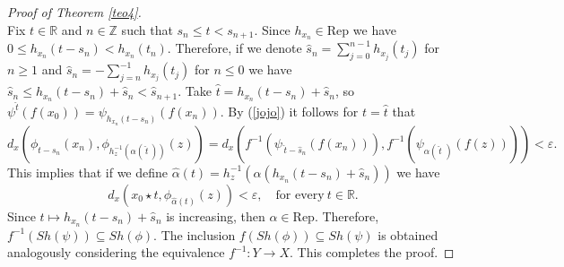 \documentclass{amsart}
\theoremstyle{definition}
\newcommand{\ep}{\varepsilon}
\begin{document}
\begin{proof}[Proof of Theorem \ref{teo4}]
\begin{equation}
\end{equation}
Fix $t\in\mathbb{R}$ and $n\in \mathbb{Z}$ such that $s_n \leq t<s_{n+1}$. Since $h_{x_n}\in\mathrm{Rep}$ we have $0\leq h_{x_n}(t-s_n)<h_{x_n}(t_n)$. Therefore, if we denote $\widehat{s}_n=\sum^{n-1}_{j=0} h_{x_{j}}(t_{j})$ for $n\geq 1$ and $\widehat{s}_n=-\sum^{-1}_{j=n} h_{x_{j}}(t_{j})$ for $n\leq 0$ we have $\widehat{s}_n\leq h_{x_n}(t-s_n)+\widehat{s}_n<\widehat{s}_{n+1}$. Take $\widehat{t}=h_{x_n}(t-s_n)+\widehat{s}_n$, so $\psi^{\widehat{t}}(f(x_0))=\psi_{h_{x_n}(t-s_n)}(f(x_n))$. By (\ref{jojo}) it follows for $t=\widehat{t}$ that
$$d_x(\phi_{t-s_n}(x_n),\phi_{h_{z}^{-1}(\alpha(\,\widehat{t}\ ))}(z))=d_x(f^{-1}(\psi_{\,\widehat{t}-\widehat{s}_n}(f(x_n))), f^{-1}(\psi_{\alpha(\,\widehat{t}\,\,)}(f(z))))<\ep.$$
This implies that if we define $\widehat{\alpha}(t)=h_{z}^{-1}(\alpha(h_{x_n}(t-s_n)+\widehat{s}_n))$ we have
$$d_x(x_0\star t,\phi_{\widehat{\alpha}(t)}(z))<\ep, \quad \mbox{for every}\  t\in\mathbb{R}.$$
Since $t\mapsto h_{x_n}(t-s_n)+\widehat{s}_n$ is increasing, then $\widehat{\alpha}\in \mathrm{Rep}$. Therefore, $f^{-1}(Sh(\psi))\subseteq Sh(\phi)$. The inclusion $f(Sh(\phi))\subseteq Sh(\psi)$ is obtained analogously considering the equivalence $f^{-1}\colon Y\to X$. This completes the proof.
\end{proof}
\end{document}
